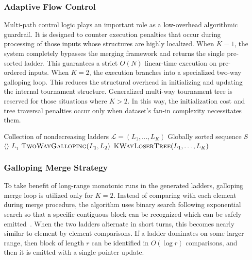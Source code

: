 \documentclass{ieeeaccess}
\theoremstyle{plain}
\theoremstyle{definition}
\begin{document}
\subsubsection{Adaptive Flow Control}

Multi-path control logic plays an important role as a low-overhead algorithmic guardrail. It is designed to counter execution penalties that occur during processing of those inputs whose structures are highly localized. When $K=1$, the system completely bypasses the merging framework and returns the single pre-sorted ladder. This guarantees a strict $O(N)$ linear-time execution on pre-ordered inputs. When $K=2$, the execution branches into a specialized two-way galloping loop. This reduces the structural overhead in initializing and updating the internal tournament structure. Generalized multi-way tournament tree is reserved for those situations where $K > 2$. In this way, the initialization cost and tree traversal penalties occur only when dataset's fan-in complexity necessitates them. 


\begin{algorithm}[t]
\caption{\textsc{MergeByK}$(L_1, \dots, L_K)$}
\label{alg:mergebyk}
\begin{algorithmic}[1]
\Require Collection of nondecreasing ladders $\mathcal{L} = (L_1, \dots, L_K)$
\Ensure Globally sorted sequence $S$
    \State \Return $\langle\rangle$
\EndIf
{} 
    \State \Return $L_1$
\EndIf
{} 
    \State \Return $\textsc{TwoWayGalloping}(L_1, L_2)$
\EndIf
\State \Return $\textsc{KWayLoserTree}(L_1, \dots, L_K)$
\end{algorithmic}
\end{algorithm}

\subsubsection{Galloping Merge Strategy}

To take benefit of long-range monotonic runs in the generated ladders, galloping merge loop is utilized only for $K=2$. Instead of comparing with each element during merge procedure, the algorithm uses binary search following exponential search so that a specific contiguous block can be recognized which can be safely emitted~\cite{Ghasemi2024}. When the two ladders alternate in short turns, this becomes nearly similar to element-by-element comparisons. If a ladder dominates on some larger range, then block of length $r$ can be identified in $O(\log r)$ comparisons, and then it is emitted with a single pointer update.
\end{document}
